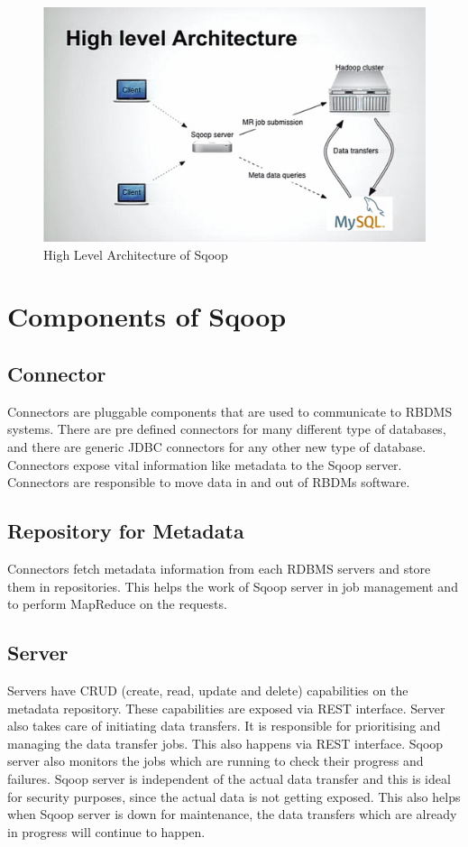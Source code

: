\documentclass[9pt,twocolumn,twoside]{styles/osajnl}
\begin{document}
\begin{figure}[htbp]
\centering
\includegraphics[width=\linewidth]{images/archi.png}
\caption{High Level Architecture of Sqoop \cite{sqoop-blog}}
\label{fig:archi}
\end{figure}


\section{Components of Sqoop}
\subsection{Connector}
Connectors are pluggable components that are used to communicate to RBDMS systems. There are pre defined connectors for many different type of databases, and there are generic JDBC connectors for any other new type of database. Connectors expose vital information like metadata to the Sqoop server. Connectors are responsible to move data in and out of RBDMs software. 
\subsection{Repository for Metadata}
Connectors fetch metadata information from each RDBMS servers and store them in repositories. This helps the work of Sqoop server in job management and to perform MapReduce on the requests.
\subsection{Server}
Servers have CRUD (create, read, update and delete) capabilities on the metadata repository. These capabilities are exposed via REST interface. Server also takes care of initiating data transfers. It is responsible for prioritising and managing the data transfer jobs. This also happens via REST interface. Sqoop server also monitors the jobs which are running to check their progress and failures. Sqoop server is independent of the actual data transfer and this is ideal for security purposes, since the actual data is not getting exposed. This also helps when Sqoop server is down for maintenance, the data transfers which are already in progress will continue to happen. 
\end{document}
